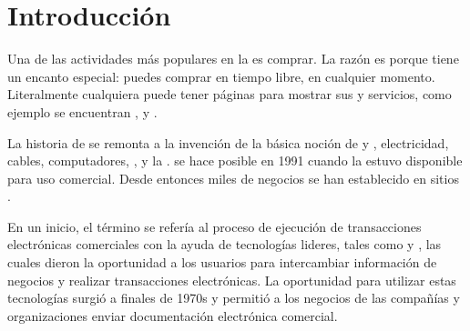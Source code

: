 \chapter{Introducción}\label{cap:intro}


		Una de las actividades más populares en la \webINT es comprar. La razón es porque tiene un encanto especial: puedes comprar en tiempo libre, en cualquier momento. Literalmente cualquiera puede tener páginas para mostrar sus \itemsCOM y servicios, como ejemplo se encuentran \amazonNAME \cite{online_amazon_official}, \ebayNAME \cite{online_ebay_official} y \bestBuyNAME \cite{online_bestbuy_official}.

		La historia de \ecommerceCOM se remonta a la invención de la básica noción de \buyingCOM y \sellingCOM, electricidad, cables, computadores, \modems, y la \internetINT. \ecommerceCOM se hace posible en 1991 cuando la \internetINT estuvo disponible para uso comercial. Desde entonces miles de negocios se han establecido en sitios \webINT.

		En un inicio, el término \ecommerceCOM se refería al proceso de ejecución  de transacciones electrónicas comerciales con la ayuda de tecnologías lideres, tales como \electDataInterCOM y \electFundsTransCOM, las cuales dieron la oportunidad a los usuarios para intercambiar información de negocios y realizar transacciones electrónicas. La oportunidad para utilizar estas tecnologías surgió a finales de 1970s \cite{online_history_ecommerce} y permitió a los negocios de las compañías y organizaciones enviar documentación electrónica comercial.

